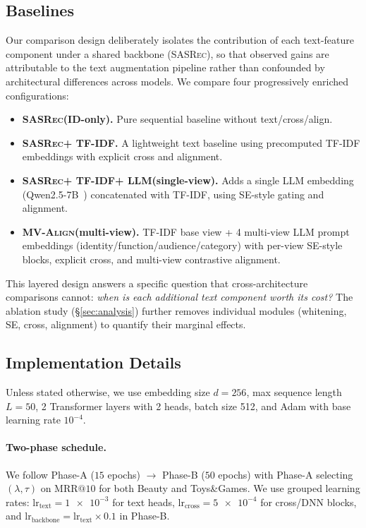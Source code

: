 \documentclass[sigconf,natbib=true,anonymous]{acmart}
\newcommand{\model}{\textsc{MV-Align}\xspace}
\newcommand{\base}{\textsc{SASRec}\xspace}
\newcommand{\tfidf}{\textsc{TF-IDF}\xspace}
\newcommand{\llm}{\textsc{LLM}\xspace}
\begin{document}
\subsection{Baselines}
Our comparison design deliberately isolates the contribution of each
text-feature component under a shared backbone (\base), so that
observed gains are attributable to the text augmentation pipeline
rather than confounded by architectural differences across models.
We compare four progressively enriched configurations:
\begin{itemize}[leftmargin=*,itemsep=2pt]
  \item \textbf{\base (ID-only).} Pure sequential baseline
    without text/cross/align.
  \item \textbf{\base + \tfidf.} A lightweight text baseline
    using precomputed \tfidf embeddings with explicit cross
    and alignment.
  \item \textbf{\base + \tfidf + \llm (single-view).} Adds a
    single \llm embedding (Qwen2.5-7B~\cite{qwen2024qwen25}) concatenated with
    \tfidf, using SE-style gating and alignment.
  \item \textbf{\model (multi-view).} \tfidf base view + 4
    multi-view \llm prompt embeddings
    (identity/function/audience/category) with per-view SE-style blocks,
    explicit cross, and multi-view contrastive alignment.
\end{itemize}
\noindent This layered design answers a specific question that
cross-architecture comparisons cannot: \emph{when is each additional
text component worth its cost?} The ablation study
(\S\ref{sec:analysis}) further removes individual modules
(whitening, SE, cross, alignment) to quantify their marginal effects.

\subsection{Implementation Details}
Unless stated otherwise, we use embedding size $d=256$, max
sequence length $L=50$, 2 Transformer layers with 2 heads,
batch size 512, and Adam with base learning rate $10^{-4}$.
\paragraph{Two-phase schedule.}
We follow Phase-A ($15$ epochs) $\rightarrow$ Phase-B ($50$
epochs) with Phase-A selecting $(\lambda,\tau)$ on
$\mathrm{MRR@10}$ for both Beauty and Toys\&Games.
We use grouped learning rates:
$\text{lr}_{\text{text}}=\num{1e-3}$ for text heads,
$\text{lr}_{\text{cross}}=\num{5e-4}$ for cross/DNN blocks,
and $\text{lr}_{\text{backbone}}=\text{lr}_{\text{text}}\times
0.1$ in Phase-B.
\end{document}
